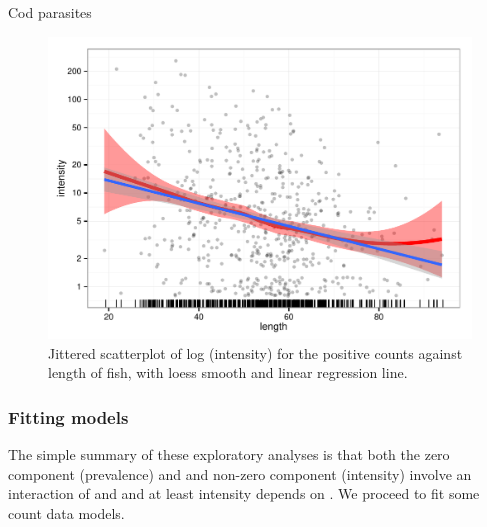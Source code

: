\documentclass[11pt]{book}\usepackage[]{graphicx}\usepackage[]{color}
\newenvironment{knitrout}{}{} %
\renewenvironment{knitrout}{\small\renewcommand{\baselinestretch}{.85}}{} %
\begin{document}
\begin{Example}[cod1]{Cod parasites}
\begin{knitrout}
\begin{figure}[!htbp]
\centerline{\includegraphics[width=.6\textwidth]{ch09/fig/cod1-length-scat-1} }

\caption[Jittered scatterplot of log (intensity) for the positive counts against length of fish, with loess smooth and linear regression line]{Jittered scatterplot of log (intensity) for the positive counts against length of fish, with loess smooth and linear regression line.\label{fig:cod1-length-scat}}
\end{figure}


\end{knitrout}
\end{Example}

\subsubsection{Fitting models}

The simple summary of these exploratory analyses is that both the zero component (prevalence) and
and non-zero component (intensity)
involve an interaction of  and  and at least intensity depends on .
We proceed to fit some count data models.
\end{document}
